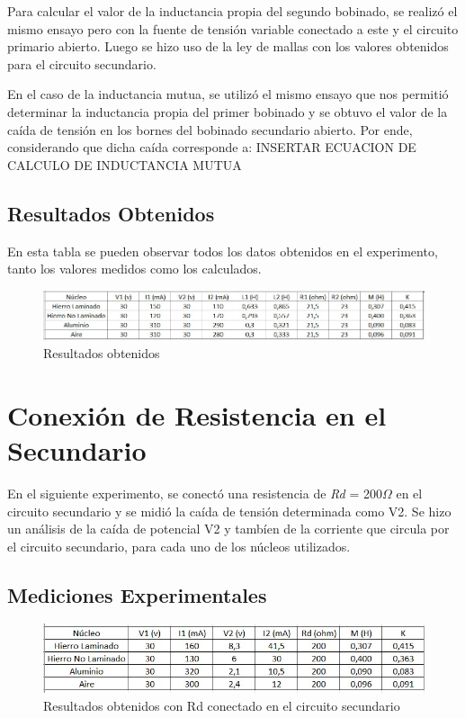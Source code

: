 \documentclass[a4paper,12pt]{article}
\begin{document}
\hspace{1cm} Para calcular el valor de la inductancia propia del segundo bobinado, se realizó el mismo ensayo pero con la fuente
de tensión variable conectado a este y el circuito primario abierto. Luego se hizo uso de la ley de mallas con los valores
obtenidos para el circuito secundario.

\hspace{1cm} En el caso de la inductancia mutua, se utilizó el mismo ensayo que nos permitió determinar la inductancia propia del primer
bobinado y se obtuvo el valor de la caída de tensión en los bornes del bobinado secundario abierto. Por ende, considerando que dicha 
caída corresponde a: INSERTAR ECUACION DE CALCULO DE INDUCTANCIA MUTUA

\subsection{Resultados Obtenidos}
\hspace{1cm} En esta tabla se pueden observar todos los datos obtenidos en el experimento, tanto los valores medidos como 
los calculados.
\begin{figure}[h!]
    \centering
    \includegraphics[width=\linewidth]{tabla1.jpg}
    \caption{Resultados obtenidos}
    \end{figure}

    \section{Conexión de Resistencia en el Secundario}
\hspace{1cm} En el siguiente experimento, se conectó una resistencia de \textit{Rd} = 200$\Omega$ en el circuito secundario y se midió 
la caída de tensión determinada como V2. Se hizo un análisis de la caída de potencial V2 y tambíen de la corriente que circula
por el circuito secundario, para cada uno de los núcleos utilizados.

\subsection{Mediciones Experimentales}

\begin{figure}[h]
    \centering
    \includegraphics[width=\linewidth]{tabla2.jpg}
    \caption{Resultados obtenidos con Rd conectado en el circuito secundario}
    \end{figure}
\end{document}
